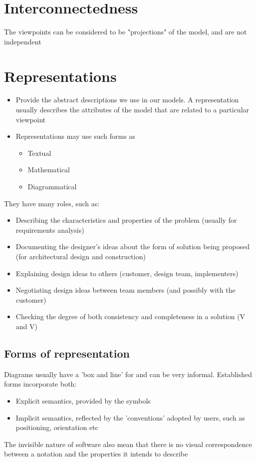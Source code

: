 \documentclass{article}[18pt]
\begin{document}
\section{Interconnectedness}
The viewpoints can be considered to be "projections" of the model, and are not independent
\section{Representations}
\begin{itemize}
	\item Provide the abstract descriptions we use in our models. A representation usually describes the attributes of the model that are related to a particular viewpoint
	\item Representations may use such forms as
	\begin{itemize}
		\item Textual
		\item Mathematical
		\item Diagrammatical
	\end{itemize}
\end{itemize}
They have many roles, such as:
\begin{itemize}
	\item Describing the characteristics and properties of the problem (usually for requirements analysis)
	\item Documenting the designer's ideas about the form of solution being proposed (for architectural design and construction)
	\item Explaining design ideas to others (customer, design team, implementers)
	\item Negotiating design ideas between team members (and possibly with the customer)
	\item Checking the degree of both consistency and completeness in a solution (V and V)
\end{itemize}
\subsection{Forms of representation}
Diagrams usually have a 'box and line' for and can be very informal. Established forms incorporate both:
\begin{itemize}
	\item Explicit semantics, provided by the symbols
	\item Implicit semantics, reflected by the 'conventions' adopted by users, such as positioning, orientation etc
\end{itemize}
The invisible nature of software also mean that there is no visual correspondence between a notation and the properties it intends to describe
\end{document}
